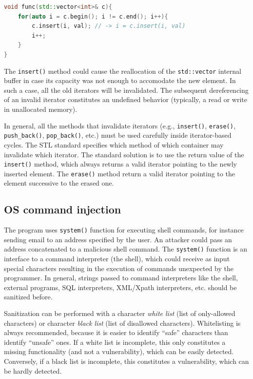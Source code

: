 \documentclass[a4paper,12pt]{article}
\begin{document}
\begin{lstlisting}[language=C++, basicstyle=\ttfamily]
void func(std::vector<int>& c){
	for(auto i = c.begin(); i != c.end(); i++){
		c.insert(i, val); // -> i = c.insert(i, val)
		i++;
	}
}
\end{lstlisting}

The \texttt{insert()} method could cause the reallocation of the \texttt{std::vector} internal buffer in case its capacity was not enough to accomodate the new element. In such a case, all the old iterators will be invalidated. The subsequent dereferencing of an invalid iterator constitutes an undefined behavior (typically, a read or write in unallocated memory).

In general, all the methods that invalidate iterators (e.g., \texttt{insert()}, \texttt{erase()}, \texttt{push\_back()}, \texttt{pop\_back()}, etc.) must be used carefully inside iterator-based cycles. The STL standard specifies which method of which container may invalidate which iterator. The standard solution is to use the return value of the \texttt{insert()} method, which always returns a valid iterator pointing to the newly inserted element. The \texttt{erase()} method return a valid iterator pointing to the element successive to the erased one.

\subsection{OS command injection}
The program uses \texttt{system()} function for executing shell commands, for instance sending email to an address specified by the user. An attacker could pass an address concatenated to a malicious shell command. The \texttt{system()} function is an interface to a command interpreter (the shell), which could receive as input special characters resulting in the execution of commands unexpected by the programmer. In general, strings passed to command interpreters like the shell, external programs, SQL interpreters, XML/Xpath interpreters, etc. should be sanitized before.


Sanitization can be performed with a character \textit{white list} (list of only-allowed characters) or character \textit{black list} (list of disallowed characters). Whitelisting is always recommended, because it is easier to identify “safe” characters than identify “unsafe” ones. If a white list is incomplete, this only constitutes a missing functionality (and not a vulnerability), which can be easily detected. Conversely, if a black list is incomplete, this constitutes a vulnerability, which can be hardly detected.
\end{document}
